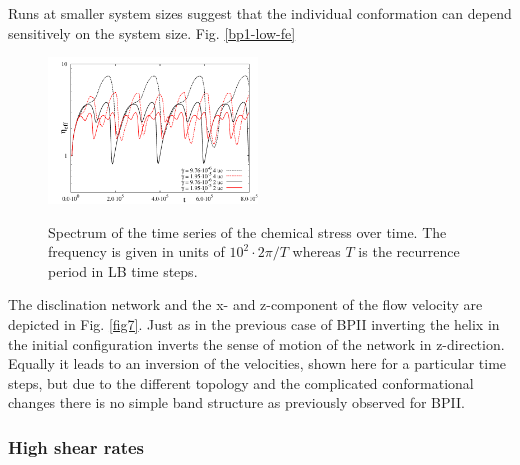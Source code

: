 \documentclass[aps,pre,reprint,superscriptaddress, twocolumn]{revtex4}
\begin{document}
Runs at smaller system sizes suggest that the individual conformation 
can depend sensitively on the system size. Fig. \ref{bp1-low-fe} 


\begin{figure}[ht]
\includegraphics[width=0.495\textwidth]{stress_bp1_2uc_4uc.pdf}
\caption{}
\label{bp0-2uc4uc-fe}
\end{figure}

\begin{figure}[ht]

\caption{Spectrum of the time series of the chemical stress over time. The frequency is given in units of $10^2\cdot 2\pi/T$ whereas $T$ is the recurrence period in LB time steps.}
\label{bp1-spec}
\end{figure}


The disclination network and the x- and z-component of the flow velocity are depicted in Fig. \ref{fig7}.
Just as in the previous case of BPII inverting the helix in the initial configuration inverts the sense of motion of the network in z-direction.
Equally it leads to an inversion of the velocities, shown here for a particular time steps, but due to the different topology and the complicated conformational changes there is no simple band structure as previously observed for BPII. 


\subsubsection{High shear rates}
\end{document}
